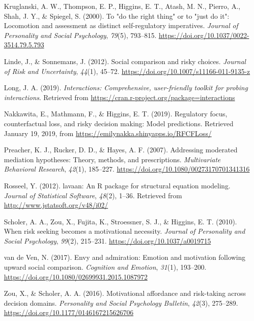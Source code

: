 \documentclass[man,floatsintext]{apa6}
\begin{document}
\leavevmode\hypertarget{ref-kruglanskietal2000}{}%
Kruglanski, A. W., Thompson, E. P., Higgins, E. T., Atash, M. N., Pierro, A., Shah, J. Y., \& Spiegel, S. (2000). To "do the right thing" or to "just do it": Locomotion and assessment as distinct self-regulatory imperatives. \emph{Journal of Personality and Social Psychology}, \emph{79}(5), 793--815. \url{https://doi.org/10.1037/0022-3514.79.5.793}

\leavevmode\hypertarget{ref-lindesonnemans2012}{}%
Linde, J., \& Sonnemans, J. (2012). Social comparison and risky choices. \emph{Journal of Risk and Uncertainty}, \emph{44}(1), 45--72. \url{https://doi.org/10.1007/s11166-011-9135-z}

\leavevmode\hypertarget{ref-R-interactions}{}%
Long, J. A. (2019). \emph{Interactions: Comprehensive, user-friendly toolkit for probing interactions}. Retrieved from \url{https://cran.r-project.org/package=interactions}

\leavevmode\hypertarget{ref-nakkawitaetal2019a}{}%
Nakkawita, E., Mathmann, F., \& Higgins, E. T. (2019). Regulatory focus, counterfactual loss, and risky decision making: Model predictions. Retrieved January 19, 2019, from \url{https://emilynakka.shinyapps.io/RFCFLoss/}

\leavevmode\hypertarget{ref-preacheretal2007}{}%
Preacher, K. J., Rucker, D. D., \& Hayes, A. F. (2007). Addressing moderated mediation hypotheses: Theory, methods, and prescriptions. \emph{Multivariate Behavioral Research}, \emph{42}(1), 185--227. \url{https://doi.org/10.1080/00273170701341316}

\leavevmode\hypertarget{ref-R-lavaan}{}%
Rosseel, Y. (2012). lavaan: An R package for structural equation modeling. \emph{Journal of Statistical Software}, \emph{48}(2), 1--36. Retrieved from \url{http://www.jstatsoft.org/v48/i02/}

\leavevmode\hypertarget{ref-scholeretal2010}{}%
Scholer, A. A., Zou, X., Fujita, K., Stroessner, S. J., \& Higgins, E. T. (2010). When risk seeking becomes a motivational necessity. \emph{Journal of Personality and Social Psychology}, \emph{99}(2), 215--231. \url{https://doi.org/10.1037/a0019715}

\leavevmode\hypertarget{ref-vandeven2017}{}%
van de Ven, N. (2017). Envy and admiration: Emotion and motivation following upward social comparison. \emph{Cognition and Emotion}, \emph{31}(1), 193--200. \url{https://doi.org/10.1080/02699931.2015.1087972}

\leavevmode\hypertarget{ref-zouscholer2016}{}%
Zou, X., \& Scholer, A. A. (2016). Motivational affordance and risk-taking across decision domains. \emph{Personality and Social Psychology Bulletin}, \emph{42}(3), 275--289. \url{https://doi.org/10.1177/0146167215626706}
\end{document}
